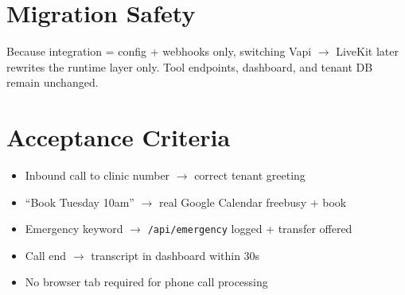 \documentclass[11pt,a4paper]{article}
\begin{document}
\section{Migration Safety}

Because integration = config + webhooks only, switching Vapi $\rightarrow$ LiveKit later rewrites the runtime layer only. Tool endpoints, dashboard, and tenant DB remain unchanged.

\section{Acceptance Criteria}

\begin{itemize}
  \item Inbound call to clinic number $\rightarrow$ correct tenant greeting
  \item ``Book Tuesday 10am'' $\rightarrow$ real Google Calendar freebusy + book
  \item Emergency keyword $\rightarrow$ \texttt{/api/emergency} logged + transfer offered
  \item Call end $\rightarrow$ transcript in dashboard within 30s
  \item No browser tab required for phone call processing
\end{itemize}
\end{document}
